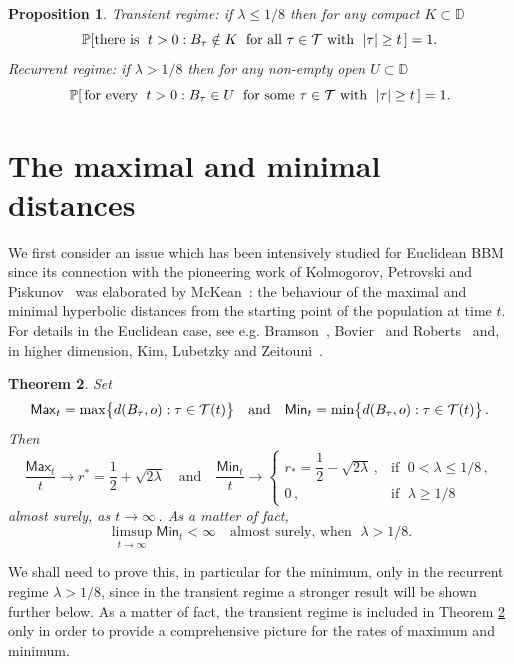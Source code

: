 \documentclass[12pt]{amsart}
\newcommand\AND{\quad\text{and}\quad}
\newcommand\BB{\textit{\textbf{B}}}
\newcommand\DD{\mathbb D}
\newcommand\Prob{\mathbb P}
\newcommand\ro{d}
\newcommand\T{\mathcal T}
\newtheorem{theorem}{Theorem}%
\numberwithin{theorem}{section}
\newtheorem{pro}[theorem]{Proposition}%
\theoremstyle{definition}
\begin{document}
\begin{pro}\label{pro:regimes}\cite{LS}
Transient regime: if $\lambda \le 1/8$ then for any compact $K \subset \DD$
$$
\Prob[ \text{there is }\; t > 0 : \BB_{\tau} \notin K\; 
\text{ for all $\tau \in \T$ with }\;|\tau| \ge t\,] =1.  
$$
Recurrent regime: if $\lambda > 1/8$ then for any non-empty open $U \subset \DD$
$$
\Prob[\,\text{for every }\; t > 0 : \BB_{\tau} \in U\; 
\text{ for some $\tau \in \T$ with }\;|\tau| \ge t \,] =1.  
$$
\end{pro}


\section{The maximal and minimal distances}\label{sec:max}

We first consider an issue which has been intensively studied for 
Euclidean BBM since its connection with the pioneering work of {\sc Kolmogorov, Petrovski and
Piskunov}~\cite{KPP} was elaborated by {\sc McKean}~\cite{McK}: the behaviour of the maximal and minimal 
hyperbolic distances from the starting point of the population at time $t$. 
For details in the Euclidean case, see e.g. {\sc Bramson}~\cite{Br}, {\sc Bovier}~\cite{Bo} 
and {\sc Roberts}~\cite{Ro} and, in higher dimension, {\sc Kim, Lubetzky and Zeitouni}~\cite{KLZ}.

\begin{theorem}\label{thm:minmax1} Set 
$$
\mathsf{Max}_t = \max \bigl\{ \ro(\BB_{\tau},o) : \tau \in \T(t) \bigr\} \AND  
\mathsf{Min}_t = \min \bigl\{ \ro(\BB_{\tau},o) : \tau \in \T(t) \bigr\}\,.
$$
Then
$$
\frac{\mathsf{Max}_t}{t} \to r^* 
= \frac12+\sqrt{2\lambda}
\AND
\frac{\mathsf{Min}_t}{t} \to 
\begin{cases} r_* = \dfrac12-\sqrt{2\lambda}\,, &\text{if }\; 0 < \lambda \le 1/8\,,\\[3pt]
              0\,, &\text{if }\; \lambda \ge 1/8 
\end{cases}
$$
almost surely, as $t \to \infty\,$. As a matter of fact, 
$$
\limsup_{t \to \infty} \mathsf{Min}_t < \infty \quad \text{almost surely, when }\; \lambda > 1/8. 
$$
\end{theorem}

We shall need to prove this, in particular for the minimum, only in the recurrent regime
$\lambda > 1/8$, since in the transient regime a stronger result will be shown further below.
As a matter of fact, the transient regime is included in Theorem \ref{thm:minmax1} only in
order to provide a comprehensive picture for the rates of maximum and minimum.
\end{document}
